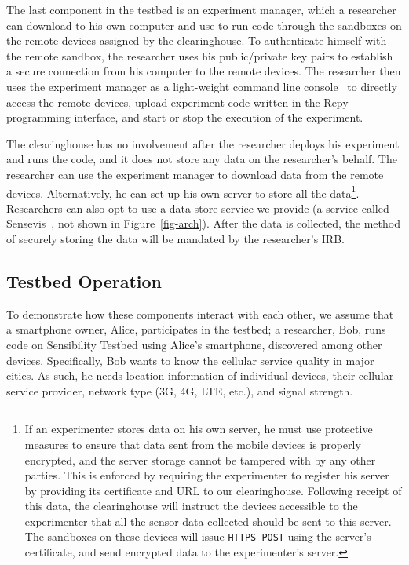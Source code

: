 The last component in the testbed is an experiment manager, which a 
researcher can download to his own computer and use to run code through 
the sandboxes on the remote devices assigned by the clearinghouse. 
To authenticate himself with the remote sandbox, the researcher uses 
his public/private key pairs to establish a secure connection from his
computer to the remote devices. The researcher then uses the
experiment manager as a light-weight command line 
console~\cite{demo-kit} to directly access the remote devices, upload 
experiment code written in the Repy programming interface, and
start or stop the execution of the experiment. 

The clearinghouse has no involvement after the researcher deploys 
his experiment and runs the code, and it does not store any
data on the researcher's behalf. The researcher
can use the experiment manager to download data from the remote devices. 
Alternatively, he can set up his own server to store all the data\footnote{\scriptsize
If an experimenter stores data on his own server, he must use protective
measures to ensure that data sent from the mobile devices is
properly encrypted, and the server storage cannot be tampered
with by any other parties. This is enforced by requiring the experimenter to register
his server by providing its certificate and URL to our
clearinghouse. Following receipt of this data, the clearinghouse will instruct the devices
accessible to the experimenter that all the sensor data collected should be
sent to this server. The sandboxes on these devices will issue
\texttt{HTTPS POST} using the server's certificate, and send encrypted
data to the experimenter's server.}. Researchers can also opt to use a data 
store service we provide (a service called Sensevis~\cite{sensevis}, 
not shown in Figure~\ref{fig-arch}). After the data is collected, the method of securely storing
the data will be mandated by the researcher's IRB.

\subsection{Testbed Operation}\label{sec-ops}

To demonstrate how these components interact with each other, we assume 
that a smartphone owner, Alice, participates in the testbed; a researcher, Bob, 
runs code on Sensibility Testbed using Alice's smartphone, discovered among other
devices. Specifically, Bob wants to know the cellular service
quality in major cities. As such, he needs location information
of individual devices, their cellular service provider, network
type (3G, 4G, LTE, etc.), and signal strength. 

